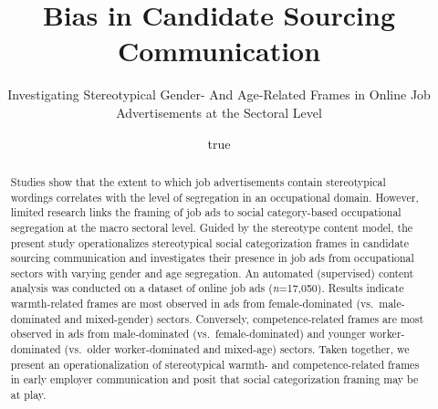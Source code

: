 \documentclass[
  12pt,
  letterpaper,
  DIV=11,
  numbers=noendperiod]{scrartcl}
\title{Bias in Candidate Sourcing Communication}
\subtitle{Investigating Stereotypical Gender- And Age-Related Frames in
Online Job Advertisements at the Sectoral Level}
\author{true}
\date{}
\begin{document}
\maketitle
\begin{abstract}
Studies show that the extent to which job advertisements contain
stereotypical wordings correlates with the level of segregation in an
occupational domain. However, limited research links the framing of job
ads to social category-based occupational segregation at the macro
sectoral level. Guided by the stereotype content model, the present
study operationalizes stereotypical social categorization frames in
candidate sourcing communication and investigates their presence in job
ads from occupational sectors with varying gender and age segregation.
An automated (supervised) content analysis was conducted on a dataset of
online job ads (\emph{n}=17,050). Results indicate warmth-related frames
are most observed in ads from female-dominated (vs.~male-dominated and
mixed-gender) sectors. Conversely, competence-related frames are most
observed in ads from male-dominated (vs.~female-dominated) and younger
worker-dominated (vs.~older worker-dominated and mixed-age) sectors.
Taken together, we present an operationalization of stereotypical
warmth- and competence-related frames in early employer communication
and posit that social categorization framing may be at play.
\end{abstract}
\ifdefined\Shaded\renewenvironment{Shaded}{\begin{tcolorbox}[borderline west={3pt}{0pt}{shadecolor}, boxrule=0pt, frame hidden, interior hidden, breakable, sharp corners, enhanced]}{\end{tcolorbox}}\fi
\end{document}
